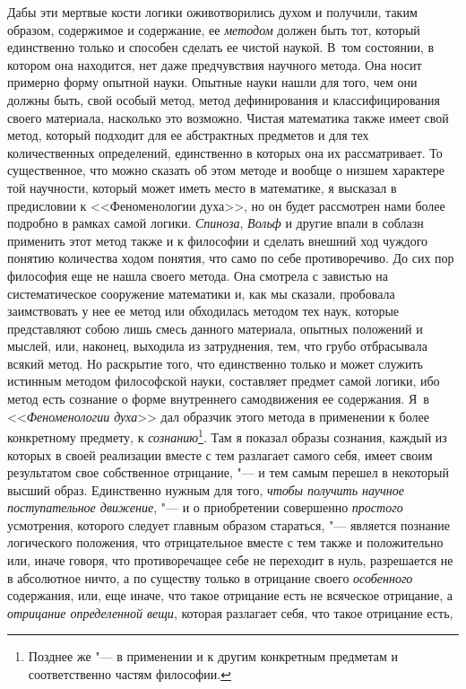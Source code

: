 Дабы эти мертвые кости логики оживотворились духом и получили, таким
образом, содержимое и содержание, ее {\em методом}
должен быть тот, который единственно только и способен сделать ее чистой
наукой. В~том состоянии, в котором она находится, нет даже предчувствия
научного метода. Она носит примерно форму опытной науки. Опытные науки
нашли для того, чем они должны быть, свой особый метод, метод дефинирования
и классифицирования своего материала, насколько это возможно. Чистая
математика также имеет свой метод, который подходит для ее абстрактных
предметов и для тех количественных определений, единственно в которых она
их рассматривает. То существенное, что можно сказать об этом методе и
вообще о низшем характере той научности, который может иметь место в
математике, я высказал в предисловии к <<Феноменологии духа>>, но он будет
рассмотрен нами более подробно в рамках самой логики.
{\em Спиноза}, {\em Вольф} и другие
впали в соблазн применить этот метод также и к философии и сделать внешний
ход чуждого понятию количества ходом понятия, что само по себе
противоречиво. До сих пор философия еще не нашла своего метода. Она
смотрела с завистью на систематическое сооружение математики и, как мы
сказали, пробовала заимствовать у нее ее метод или обходилась методом тех
наук, которые представляют собою лишь смесь данного материала, опытных
положений и мыслей, или, наконец, выходила из затруднения, тем, что грубо
отбрасывала всякий метод. Но раскрытие того, что единственно только и может
служить истинным методом философской науки, составляет предмет самой
логики, ибо метод есть сознание о форме внутреннего самодвижения ее
содержания. Я~в <<{\em Феноменологии духа}>> дал образчик
этого метода в применении к более конкретному предмету, к
{\em сознанию}\footnote{Позднее же "--- в применении
и к другим конкретным предметам и соответственно частям философии.}.
Там я показал образы сознания, каждый из которых в своей реализации вместе
с тем разлагает самого себя, имеет своим результатом свое собственное
отрицание, "--- и тем самым перешел в некоторый высший образ. Единственно
нужным для того, {\em чтобы получить научное
поступательное движение}, "--- и о приобретении совершенно
{\em простого} усмотрения, которого следует главным
образом стараться, "--- является познание логического положения, что
отрицательное вместе с тем также и положительно или, иначе говоря, что
противоречащее себе не переходит в нуль, разрешается не в абсолютное ничто,
а по существу только в отрицание своего
{\em особенного} содержания, или, еще иначе, что такое
отрицание есть не всяческое отрицание, а {\em отрицание
определенной вещи}, которая разлагает себя, что такое отрицание есть,
